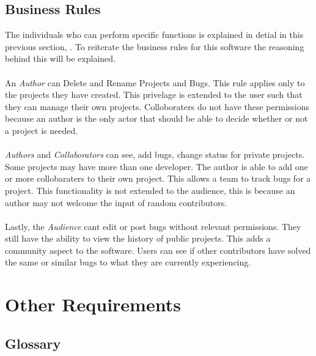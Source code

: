 \documentclass{article}
\newcommand{\comment}[1]{}
\begin{document}
\subsection{Business Rules}
\comment{
List any principles about the product, such as which individuals or roles can perform which functions under specific circumstances. These are not functional requirments in themselves, but they may imply certain functional to enforce the rules.
	}
The individuals who can perform specific functions is explained in detial in this previous section, . To reiterate the business rules for this software the reasoning behind this will be explained.
\\ \\
An \emph{Author} can Delete and Rename Projects and Bugs. This rule applies only to the projects they have created. This privelage is extended to the user such that they can manage their own projects. Colloboraters do not have these permissions because an author is the only actor that should be able to decide whether or not a project is needed.
\\ \\
\emph{Authors} and \emph{Collaborators} can see, add bugs, change status for private projects. Some projects may have more than one developer. The author is able to add one or more collobaraters to their own project. This allows a team to track bugs for a project. This functionality is not extended to the audience, this is because an author may not welcome the input of random contributors.
\\ \\
Lastly, the \emph{Audience} cant edit or post bugs without relevant permissions. They still have the ability to view the history of public projects. This adds a community aspect to the software. Users can see if other contributors have solved the same or similar bugs to what they are currently experiencing.
\newpage

\section{Other Requirements}
\comment{
	Define any other requirements not covered elsewhere in the \acrshort{srs}. This might include database requirements, internationalization requirments, legal requirments, reuse objectives for the projects, and so on. Add any new sections that are pertinent to the project.
	}
\subsection{Glossary}\label{glossary}
\comment{
Define all the terms necessary to properly interpret the \acrshort{srs}, including acronyms and abbreviations. You may wish to build a seperate gglossary that spans multiple projects or the entire organization, and just include terms specific to a single project in each \acrshort{srs}.
	}
\printglossary[type=\acronymtype]
\end{document}
